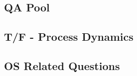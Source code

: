 \documentclass[fontsize=5pt]{scrartcl}
\begin{document}
\begin{multicols}{3}
    
  \section{QA Pool}
    \subsection{T/F - Process Dynamics}

    \subsection{OS Related Questions}


  \end{multicols}
\end{document}
